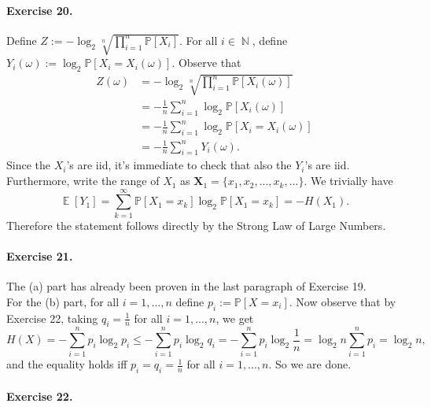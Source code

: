 \documentclass[12pt,a4paper]{report}
\theoremstyle{definition}
\theoremstyle{num.custom-title}
\DeclareMathOperator{\E}{\mathbb{E}}
\DeclareMathOperator{\N}{\mathbb{N}}
\newcommand{\X}{\mathbf{X}}
\renewcommand{\1}{\mathbbm{1}}
\renewcommand{\P}{\mathbb{P}}
\begin{document}
\paragraph{Exercise 20.} Define $Z := -\log_2 \sqrt[n]{\prod_{i=1}^n \P[X_i]}$. For all $i \in \N$, define $Y_i(\omega) := \log_2 \P[X_i=X_i(\omega)]$. Observe that
\begin{align*}
Z(\omega) 
&= -\log_2 \sqrt[n]{\prod_{i=1}^n \P[X_i(\omega)]} \\
&= -\frac{1}{n} \sum_{i=1}^n \log_2 \P[X_i(\omega)] \\
&= -\frac{1}{n} \sum_{i=1}^n \log_2 \P[X_i = X_i(\omega)] \\
&= -\frac{1}{n} \sum_{i=1}^n Y_i(\omega).
\end{align*}
Since the $X_i$'s are iid, it's immediate to check that also the $Y_i$'s are iid. Furthermore, write the range of $X_1$ as $\X_1 = \{x_1,x_2,...,x_k,...\}$. We trivially have
\[
\E[Y_1] = \sum_{k=1}^\infty \P[X_1=x_k] \log_2 \P[X_1=x_k] = -H(X_1).
\]
Therefore the statement follows directly by the Strong Law of Large Numbers.


\paragraph{Exercise 21.}

The (a) part has already been proven in the last paragraph of Exercise 19.\\
For the (b) part, for all $i=1,...,n$ define $p_i := \P[X=x_i]$. Now observe that by Exercise 22, taking $q_i=\frac{1}{n}$ for all $i=1,...,n$, we get
\[
H(X) = -\sum_{i=1}^n p_i \log_2 p_i \leq -\sum_{i=1}^n p_i \log_2 q_i =  -\sum_{i=1}^n p_i \log_2 \frac{1}{n} = \log_2 n \sum_{i=1}^n p_i = \log_2 n,
\]
and the equality holds iff $p_i=q_i=\frac{1}{n}$ for all $i=1,...,n$. So we are done.



\paragraph{Exercise 22.}
\end{document}
